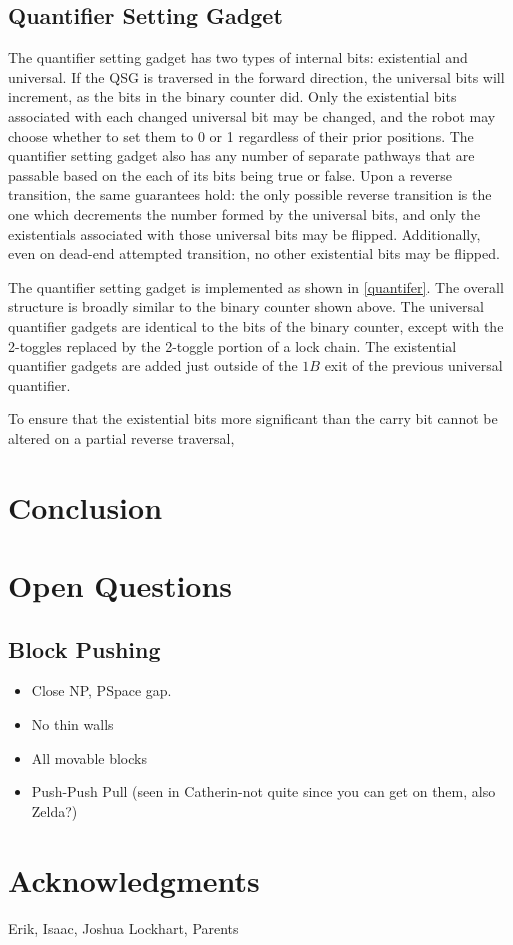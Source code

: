 \documentclass[11pt]{article}
\begin{document}
\subsection{Quantifier Setting Gadget}
The quantifier setting gadget has two types of internal bits: existential and universal. If the QSG is traversed
in the forward direction, the universal bits will increment, as the bits in the binary counter did.
Only the existential bits associated with each changed universal bit may be changed, and the robot may
choose whether to set them to 0 or 1 regardless of their prior positions. The quantifier setting gadget
also has any number of separate pathways that are passable based on the each of its bits being true or false.
Upon a reverse transition, the same guarantees hold: the only possible reverse transition is the one which
decrements the number formed by the universal bits, and only the existentials associated with those
universal bits may be flipped. Additionally, even on dead-end attempted transition, no other existential
bits may be flipped.

The quantifier setting gadget is implemented as shown in \ref{quantifer}. The overall structure is broadly
similar to the binary counter shown above. The universal quantifier gadgets are identical to the bits of the
binary counter, except with the 2-toggles replaced by the 2-toggle portion of a lock chain. The existential
quantifier gadgets are added just outside of the $1B$ exit of the previous universal quantifier.

To ensure that the existential bits more significant than the carry bit cannot be altered on a partial
reverse traversal, 
\section{Conclusion}

\section{Open Questions}

\subsection{Block Pushing}
\begin{itemize}
\item Close NP, PSpace gap.
\item No thin walls
\item All movable blocks
\item Push-Push Pull (seen in Catherin-not quite since you can get on them, also Zelda?)
\end{itemize}

\section{Acknowledgments}
Erik, Isaac, Joshua Lockhart, Parents




{}
\end{document}
